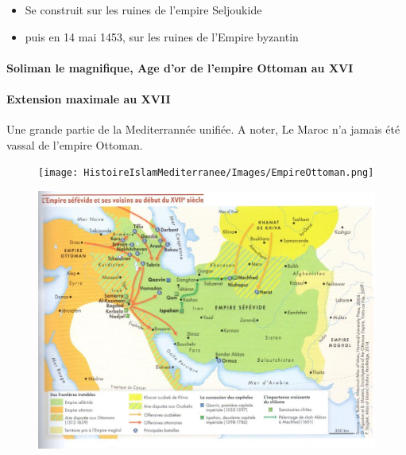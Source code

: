 \begin{itemize}
    \item Se construit sur les ruines de l'empire Seljoukide
    \item puis en 14 mai 1453, sur les ruines de l'Empire byzantin
\end{itemize}

\paragraph{Soliman le magnifique, Age d'or de l'empire Ottoman au XVI}
\paragraph{Extension maximale au XVII} Une grande partie de la Mediterrannée unifiée.
A noter, Le Maroc n'a jamais été vassal de l'empire Ottoman. 
\begin{figure}[h!]
    \centering
    \texttt{[image: HistoireIslamMediterranee/Images/EmpireOttoman.png]}

    \label{fig:my_label}
\end{figure}

\begin{figure}
    \centering
    \includegraphics[width=\textwidth]{HistoireIslamMediterranee/Images/EmpireSefevide.jpg}

    \label{fig:my_label}
\end{figure}

